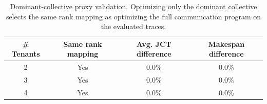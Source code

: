 \begin{table}[t]
\centering
\caption{Dominant-collective proxy validation. Optimizing only the dominant collective selects the same rank mapping as optimizing the full communication program on the evaluated traces.}
\label{tab:dominant-full-validation}
\begin{tabular}{cccc}
\toprule
\# Tenants & Same rank mapping & Avg. JCT difference & Makespan difference \\
\midrule
2 & Yes & 0.0\% & 0.0\% \\
3 & Yes & 0.0\% & 0.0\% \\
4 & Yes & 0.0\% & 0.0\% \\
\bottomrule
\end{tabular}
\end{table}
